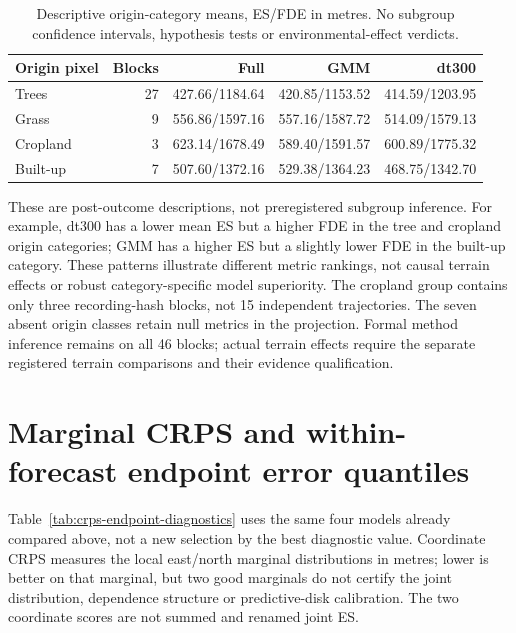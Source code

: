 \begin{table}[htbp]
\centering\small
\caption{Descriptive origin-category means, ES/FDE in metres. No subgroup
confidence intervals, hypothesis tests or environmental-effect verdicts.}
\label{tab:origin-cover-methods}\hypertarget{tab:origin-cover-methods}{}
\begin{tabular}{lrrrr}
\toprule
Origin pixel & Blocks & Full & GMM & dt300\\
\midrule
Trees & 27 & 427.66/1184.64 & 420.85/1153.52 & 414.59/1203.95\\
Grass & 9 & 556.86/1597.16 & 557.16/1587.72 & 514.09/1579.13\\
Cropland & 3 & 623.14/1678.49 & 589.40/1591.57 & 600.89/1775.32\\
Built-up & 7 & 507.60/1372.16 & 529.38/1364.23 & 468.75/1342.70\\
\bottomrule
\end{tabular}
\end{table}

These are post-outcome descriptions, not preregistered subgroup inference.
For example, dt300 has a lower mean ES but a higher FDE in the tree and
cropland origin categories; GMM has a higher ES but a slightly lower FDE in
the built-up category. These patterns illustrate different metric rankings,
not causal terrain effects or robust category-specific model superiority.
The cropland group contains only three recording-hash blocks, not 15
independent trajectories. The seven absent origin classes retain null
metrics in the projection. Formal method inference remains on all 46
blocks; actual terrain effects require the separate registered terrain
comparisons and their evidence qualification.





\section{Marginal CRPS and within-forecast endpoint error quantiles}
\label{sec:secondary-score-diagnostics}\hypertarget{sec:secondary-score-diagnostics}{}
Table~\ref{tab:crps-endpoint-diagnostics} uses the same four models already
compared above, not a new selection by the best diagnostic value. Coordinate
CRPS measures the local east/north marginal distributions in metres; lower is
better on that marginal, but two good marginals do not certify the joint
distribution, dependence structure or predictive-disk calibration. The two
coordinate scores are not summed and renamed joint ES.

